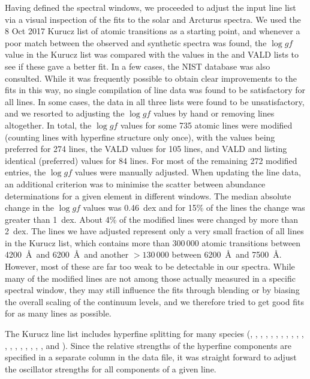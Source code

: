 \documentclass{aa}
\begin{document}
Having defined the spectral windows, we proceeded to adjust the input line list via a visual inspection of the fits to the solar and Arcturus spectra. We used the 8 Oct 2017 Kurucz list of atomic transitions as a starting point, and whenever a poor match between the observed and synthetic spectra was found, the $\log gf$ value in the Kurucz list was compared with the values in the  and VALD \citep{Piskunov1995,Kupka1999} lists to see if these gave a better fit. In a few cases, the NIST database \citep{NIST} was also consulted. While it was frequently possible to obtain clear improvements to the fits in this way, no single compilation of line data was found to be satisfactory for all lines. In some cases, the data in all three lists were found to be unsatisfactory, and we resorted to adjusting the $\log gf$ values by hand or removing lines altogether. In total, the $\log gf$ values for some 735 atomic lines were modified (counting lines with hyperfine structure only once), with the  values being preferred for 274 lines, the VALD values for 105 lines, and VALD and  listing identical (preferred) values for 84 lines. For most of the remaining 272 modified entries, the $\log gf$ values were manually adjusted. 
When updating the line data, an additional criterion was to minimise the scatter between abundance determinations for a given element in different windows. 
The median absolute change in the $\log gf$ values was 0.46~dex and for 15\% of the lines the change was greater than 1~dex.  About 4\% of the modified lines were changed by more than 2~dex. The lines we have adjusted represent only a very small fraction of all lines in the Kurucz list, which contains more than $300\, 000$ atomic transitions between 4200~\AA\ and 6200~\AA\ and another $>130\, 000$ between 6200~\AA\ and 7500~\AA. However, most of these are far too weak to be detectable in our spectra. While many of the modified lines are not among those actually measured in a specific spectral window, they may still influence the fits through blending or by biasing the overall scaling of the continuum levels, and we therefore tried to get good fits for as many lines as possible.  


The Kurucz line list includes hyperfine splitting for many species
(, , , , , , , , , 
, , , , , , , , ,
, and ). Since the relative strengths of the hyperfine components are specified in a separate column in the data file, it was straight forward to adjust the oscillator strengths for all components of a given line.
\end{document}
